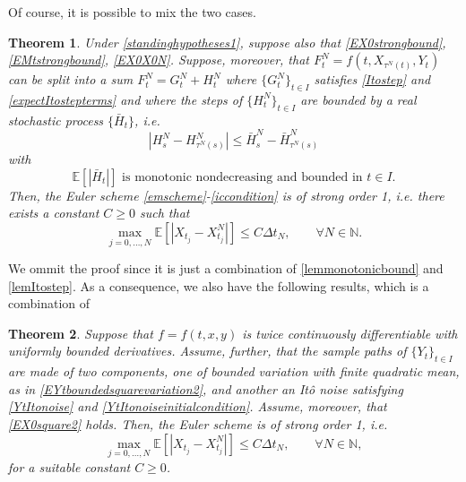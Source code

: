 \documentclass[reqno,12pt]{amsart}
\theoremstyle{plain}%
\newtheorem{thm}{Theorem}[section]
\theoremstyle{definition}
\begin{document}
Of course, it is possible to mix the two cases.

\begin{thm}
    \label{thmmixedcase}
    Under \cref{standinghypotheses1}, suppose also that
    \eqref{EX0strongbound}, \eqref{EMtstrongbound}, \eqref{EX0X0N}. Suppose, moreover, that $F_t^N = f(t, X_{\tau^N(t)}, Y_t)$ can be split into a sum $F_t^N = G_t^N + H_t^N$ where $\{G_t^N\}_{t\in I}$ satisfies \eqref{Itostep} and \eqref{expectItostepterms} and where the steps of $\{H_t^N\}_{t\in I}$ are bounded by a real stochastic process $\{\bar H_t\}$, i.e.
    \begin{equation}
        \label{stepHbound}
        |H_s^N - H_{\tau^N(s)}^N| \leq \bar H_s^N - \bar H_{\tau^N(s)}^N
    \end{equation}
    with
    \begin{equation}
      \label{expectstepHmonotonic}
      \mathbb{E}[|\bar H_t|] \textrm{ is monotonic nondecreasing and bounded in } t\in I.
    \end{equation}
    Then, the Euler scheme \eqref{emscheme}-\eqref{iccondition} is of strong order 1, i.e. there exists a constant $C\geq 0$ such that
    \begin{equation}
      \label{thmmixedtrongordernew}
        \max_{j=0, \ldots, N}\mathbb{E}\left[ \left| X_{t_j} - X_{t_j}^N \right| \right] \leq C \Delta t_N, \qquad \forall N \in \mathbb{N}.
    \end{equation}
\end{thm}

We ommit the proof since it is just a combination of \cref{lemmonotonicbound} and \cref{lemItostep}. As a consequence, we also have the following results, which is a combination of 

\begin{thm}
    \label{thmmixedcasepractical}
    Suppose that $f=f(t, x, y)$ is twice continuously differentiable with uniformly bounded derivatives. Assume, further, that the sample paths of $\{Y_t\}_{t\in I}$ are made of two components, one of bounded variation with finite quadratic mean, as in \eqref{EYtboundedsquarevariation2}, and another an It\^o noise satisfying \eqref{YtItonoise} and \eqref{YtItonoiseinitialcondition}. Assume, moreover, that \eqref{EX0square2} holds. Then, the Euler scheme is of strong order 1, i.e.
    \begin{equation}
        \max_{j=0, \ldots, N}\mathbb{E}\left[ \left| X_{t_j} - X_{t_j}^N \right| \right] \leq C \Delta t_N, \qquad \forall N \in \mathbb{N},
    \end{equation}
    for a suitable constant $C \geq 0$.
\end{thm}
\end{document}
